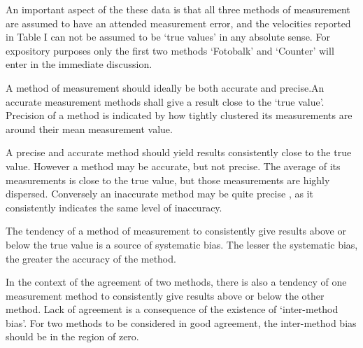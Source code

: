 \documentclass[12pt, a4paper]{report}
\begin{document}
An important aspect of the these data is that all three methods of
measurement are assumed to have an attended measurement error, and
the velocities reported in Table I can not be assumed to be `true
values' in any absolute sense. For expository purposes only the
first two methods `Fotobalk' and `Counter' will enter in the
immediate discussion.


A method of measurement should ideally be both accurate and precise.An accurate measurement methods shall give a result close to the `true value'. Precision of a method is indicated by how tightly clustered its measurements are around their mean measurement value.

A precise and accurate method should yield results consistently close to the true value. However a method may be accurate, but not precise. The average of its measurements is close to the true
value, but those measurements are highly dispersed. Conversely an inaccurate method may be quite precise , as it consistently indicates the same level of inaccuracy.

The tendency of a method of measurement to consistently give results above or below the true value is a source of systematic bias. The lesser the systematic bias, the greater the accuracy of the method.

In the context of the agreement of two methods, there is also a tendency of one measurement method to consistently give results above or below the other method. Lack of agreement is a consequence of the existence of `inter-method bias'. For two methods to be considered in good agreement, the inter-method bias should be in the region of zero.
\end{document}
